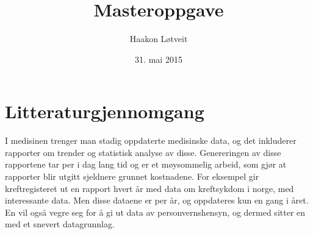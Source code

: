 \documentclass[11pt]{article}
\begin{document}


\title{Masteroppgave}
\author{Haakon Løtveit}
\date{31. mai 2015}
\maketitle

\section{Litteraturgjennomgang}
I medisinen trenger man stadig oppdaterte medisinske data, og det inkluderer rapporter om trender og statistisk analyse av disse.
Genereringen av disse rapportene tar per i dag lang tid og er et møysommelig arbeid, som gjør at rapporter blir utgitt sjeldnere grunnet kostnadene.
For eksempel gir kreftregisteret ut en rapport hvert år med data om kreftsykdom i norge, med interessante data. Men disse dataene er per år, og oppdateres kun en gang i året.
En vil også vegre seg for å gi ut data av personvernshensyn, og dermed sitter en med et snevert datagrunnlag.
\end{document}

